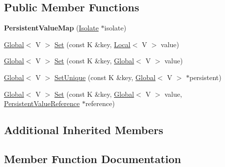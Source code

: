 \subsection*{Public Member Functions}
\begin{DoxyCompactItemize}
\item 
\hypertarget{classv8_1_1_persistent_value_map_af8000a75ef84fa719724dc4dadc1e5ee}{}{\bfseries Persistent\+Value\+Map} (\hyperlink{classv8_1_1_isolate}{Isolate} $\ast$isolate)\label{classv8_1_1_persistent_value_map_af8000a75ef84fa719724dc4dadc1e5ee}

\item 
\hyperlink{classv8_1_1_global}{Global}$<$ V $>$ \hyperlink{classv8_1_1_persistent_value_map_a4527a2e1b25a9f1772317f948382d9f9}{Set} (const K \&key, \hyperlink{classv8_1_1_local}{Local}$<$ V $>$ value)
\item 
\hyperlink{classv8_1_1_global}{Global}$<$ V $>$ \hyperlink{classv8_1_1_persistent_value_map_a00f89f1b7665698349f98b04d0059180}{Set} (const K \&key, \hyperlink{classv8_1_1_global}{Global}$<$ V $>$ value)
\item 
\hyperlink{classv8_1_1_global}{Global}$<$ V $>$ \hyperlink{classv8_1_1_persistent_value_map_a97ab74c7670e65dd5f95ec2940c4ab11}{Set\+Unique} (const K \&key, \hyperlink{classv8_1_1_global}{Global}$<$ V $>$ $\ast$persistent)
\item 
\hyperlink{classv8_1_1_global}{Global}$<$ V $>$ \hyperlink{classv8_1_1_persistent_value_map_a8128f8cff6ed0f3177e966b28cc081ba}{Set} (const K \&key, \hyperlink{classv8_1_1_global}{Global}$<$ V $>$ value, \hyperlink{classv8_1_1_persistent_value_map_base_1_1_persistent_value_reference}{Persistent\+Value\+Reference} $\ast$reference)
\end{DoxyCompactItemize}
\subsection*{Additional Inherited Members}


\subsection{Member Function Documentation}
\hypertarget{classv8_1_1_persistent_value_map_a4527a2e1b25a9f1772317f948382d9f9}{}
